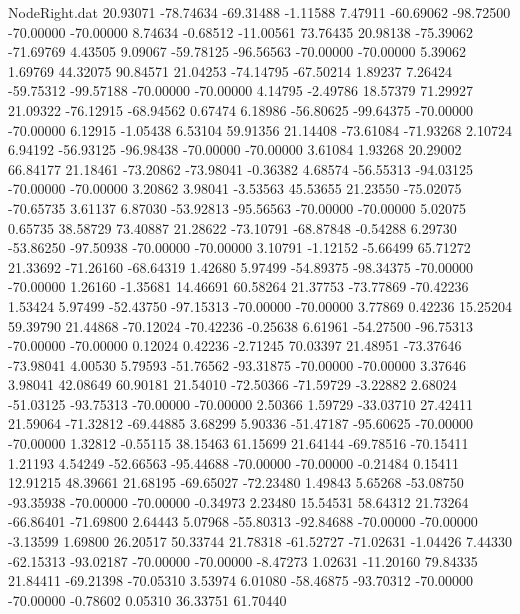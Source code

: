 \begin{filecontents}{NodeRight.dat}
  20.93071  -78.74634  -69.31488    -1.11588    7.47911  -60.69062  -98.72500  -70.00000  -70.00000    8.74634   -0.68512  -11.00561   73.76435
  20.98138  -75.39062  -71.69769     4.43505    9.09067  -59.78125  -96.56563  -70.00000  -70.00000    5.39062    1.69769   44.32075   90.84571
  21.04253  -74.14795  -67.50214     1.89237    7.26424  -59.75312  -99.57188  -70.00000  -70.00000    4.14795   -2.49786   18.57379   71.29927
  21.09322  -76.12915  -68.94562     0.67474    6.18986  -56.80625  -99.64375  -70.00000  -70.00000    6.12915   -1.05438    6.53104   59.91356
  21.14408  -73.61084  -71.93268     2.10724    6.94192  -56.93125  -96.98438  -70.00000  -70.00000    3.61084    1.93268   20.29002   66.84177
  21.18461  -73.20862  -73.98041    -0.36382    4.68574  -56.55313  -94.03125  -70.00000  -70.00000    3.20862    3.98041   -3.53563   45.53655
  21.23550  -75.02075  -70.65735     3.61137    6.87030  -53.92813  -95.56563  -70.00000  -70.00000    5.02075    0.65735   38.58729   73.40887
  21.28622  -73.10791  -68.87848    -0.54288    6.29730  -53.86250  -97.50938  -70.00000  -70.00000    3.10791   -1.12152   -5.66499   65.71272
  21.33692  -71.26160  -68.64319     1.42680    5.97499  -54.89375  -98.34375  -70.00000  -70.00000    1.26160   -1.35681   14.46691   60.58264
  21.37753  -73.77869  -70.42236     1.53424    5.97499  -52.43750  -97.15313  -70.00000  -70.00000    3.77869    0.42236   15.25204   59.39790
  21.44868  -70.12024  -70.42236    -0.25638    6.61961  -54.27500  -96.75313  -70.00000  -70.00000    0.12024    0.42236   -2.71245   70.03397
  21.48951  -73.37646  -73.98041     4.00530    5.79593  -51.76562  -93.31875  -70.00000  -70.00000    3.37646    3.98041   42.08649   60.90181
  21.54010  -72.50366  -71.59729    -3.22882    2.68024  -51.03125  -93.75313  -70.00000  -70.00000    2.50366    1.59729  -33.03710   27.42411
  21.59064  -71.32812  -69.44885     3.68299    5.90336  -51.47187  -95.60625  -70.00000  -70.00000    1.32812   -0.55115   38.15463   61.15699
  21.64144  -69.78516  -70.15411     1.21193    4.54249  -52.66563  -95.44688  -70.00000  -70.00000   -0.21484    0.15411   12.91215   48.39661
  21.68195  -69.65027  -72.23480     1.49843    5.65268  -53.08750  -93.35938  -70.00000  -70.00000   -0.34973    2.23480   15.54531   58.64312
  21.73264  -66.86401  -71.69800     2.64443    5.07968  -55.80313  -92.84688  -70.00000  -70.00000   -3.13599    1.69800   26.20517   50.33744
  21.78318  -61.52727  -71.02631    -1.04426    7.44330  -62.15313  -93.02187  -70.00000  -70.00000   -8.47273    1.02631  -11.20160   79.84335
  21.84411  -69.21398  -70.05310     3.53974    6.01080  -58.46875  -93.70312  -70.00000  -70.00000   -0.78602    0.05310   36.33751   61.70440

\end{filecontents}
